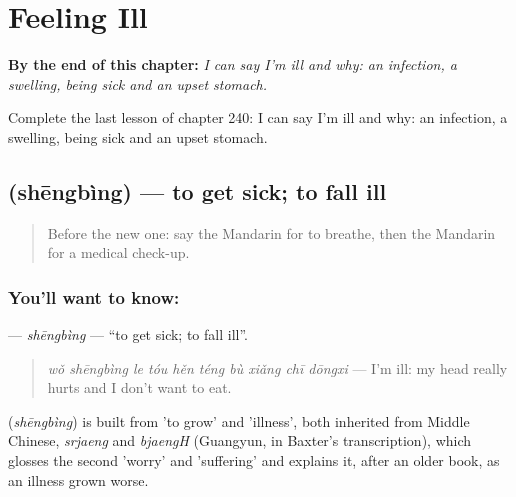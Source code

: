 
\chapter{Feeling Ill}
\label{ch:zh-feeling-ill}

\begin{chapteropening}
\textbf{By the end of this chapter:} \emph{I can say I'm ill and why: an infection, a swelling, being sick and an upset stomach.}

Complete the last lesson of chapter 240: I can say I'm ill and why: an infection, a swelling, being sick and an upset stomach.
\end{chapteropening}

\section[\texorpdfstring{\zh{生病} (shēngbìng)}{生病 (shēngbìng)}]{ (shēngbìng) — to get sick; to fall ill}

\label{lesson:ZH-C240-shengbing}



\begin{quote}
Before the new one: say the Mandarin for to breathe, then the Mandarin for a medical check-up.
\end{quote}

\subsection*{You'll want to know: }
\textbf{} — \emph{shēngbìng} — \textquotedblleft{}to get sick; to fall ill\textquotedblright{}.

\begin{quote}
\textbf{} \emph{wǒ shēngbìng le tóu hěn téng bù xiǎng chī dōngxi} — I'm ill: my head really hurts and I don't want to eat.
\end{quote}

\begin{cousinweb}
\textbf{} (\emph{shēngbìng}) is built from  'to grow' and  'illness', both inherited from Middle Chinese, \emph{srjaeng} and \emph{bjaengH} (Guangyun, in Baxter's transcription), which glosses the second 'worry' and 'suffering' and explains it, after an older book, as an illness grown worse.
\end{cousinweb}

